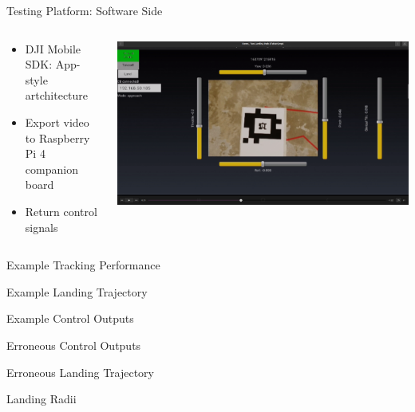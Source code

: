 \documentclass[aspectratio=169]{beamer}
\begin{document}
\begin{frame}{Testing Platform: Software Side}
	\begin{columns}
	\begin{column}{0.5\textwidth}
	\begin{itemize}
		\item DJI Mobile SDK: App-style artchitecture
		\item Export video to Raspberry Pi 4 companion board
		\item Return control signals
	\end{itemize}
	\end{column}
	\begin{column}{0.5\textwidth}
		\centering
		\includegraphics[width=\textwidth]{./images/tablet_screenshot}
	\end{column}
	\end{columns}
\end{frame}

\begin{frame}{Example Tracking Performance}
\end{frame}

\begin{frame}{Example Landing Trajectory}
\end{frame}

\begin{frame}{Example Control Outputs}
\end{frame}

\begin{frame}{Erroneous Control Outputs}
\end{frame}

\begin{frame}{Erroneous Landing Trajectory}
\end{frame}

\begin{frame}{Landing Radii}
\end{frame}
\end{document}
